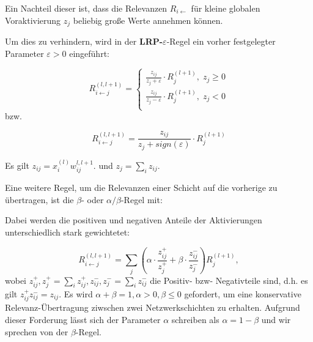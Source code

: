 \documentclass[11pt,a4paper]{article}
\numberwithin{equation}{section}
\begin{document}
	Ein Nachteil dieser ist, dass die Relevanzen $R_{i \leftarrow}$ für kleine globalen Voraktivierung $z_j$ beliebig große Werte annehmen können.
	
	Um dies zu verhindern, wird in der \textbf{LRP-$\varepsilon$}-Regel ein vorher festgelegter Parameter $\varepsilon > 0$ eingeführt:
	
	\begin{equation}
	R_{i\leftarrow j}^{(l,l+1)} = \begin{cases}
	\frac{z_{ij}}{z_j +\varepsilon} \cdot R_j^{(l+1)}, \; z_j \geq 0\\
	\frac{z_{ij}}{z_j -\varepsilon}\cdot R_j^{(l+1)}, \; z_j < 0\\
	\end{cases}
	\end{equation}
	bzw.
	
	\begin{equation}
	R_{i\leftarrow j}^{(l,l+1)} = 
	\frac{z_{ij}}{z_j + sign(\varepsilon)} \cdot R_j^{(l+1)}
	\end{equation}
	
	Es gilt $z_{ij} = x_i^{(l)}w_{ij}^{l,l+1}$. und $z_j = \sum_i{z_{ij}}$.
	
	Eine weitere Regel, um die Relevanzen einer Schicht auf die vorherige zu übertragen, ist die $\beta$- oder $\alpha/\beta$-Regel mit:
	
	Dabei werden die positiven und negativen Anteile der Aktivierungen unterschiedlich stark gewichtetet:
	
	\begin{equation}
		R_{i\leftarrow j}^{(l,l+1)} = \sum_j{\left( \alpha \cdot \frac{z_{ij}^+}{z_j^+} + \beta \cdot \frac{z_{ij}^-}{z_j^-}\right)R_j^{(l+1)}},
	\end{equation}
	wobei $z_{ij}^+, z_j^+ = \sum_i{z_{ij}^+}, z_{ij}^-, z_j^- = \sum_i{z_{ij}^-}$ die Positiv- bzw- Negativteile sind, d.h. es gilt $z_{ij}^+ z_{ij}^- = z_{ij}$. Es wird $\alpha + \beta = 1, \alpha > 0, \beta \leq 0$ gefordert, um eine konservative Relevanz-Übertragung ziwschen zwei Netzwerkschichten zu erhalten. Aufgrund dieser Forderung lässt sich der Parameter $\alpha$ schreiben als $\alpha = 1- \beta$ und wir sprechen von der $\beta$-Regel.  
	
\end{document}
